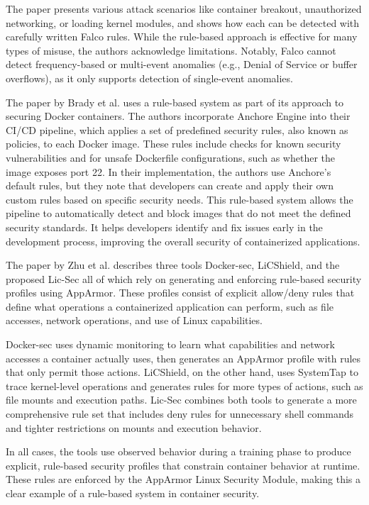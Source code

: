\begin{doublespace}
The paper presents various attack scenarios like container breakout, unauthorized networking, or loading kernel modules, and shows how each can be detected with carefully written Falco rules. While the rule-based approach is effective for many types of misuse, the authors acknowledge limitations. Notably, Falco cannot detect frequency-based or multi-event anomalies (e.g., Denial of Service or buffer overflows), as it only supports detection of single-event anomalies.

The paper by Brady et al. \cite{brady2020docker} uses a rule-based system as part of its approach to securing Docker containers. The authors incorporate Anchore Engine into their CI/CD pipeline, which applies a set of predefined security rules, also known as policies, to each Docker image. These rules include checks for known security vulnerabilities and for unsafe Dockerfile configurations, such as whether the image exposes port 22. In their implementation, the authors use Anchore's default rules, but they note that developers can create and apply their own custom rules based on specific security needs. This rule-based system allows the pipeline to automatically detect and block images that do not meet the defined security standards. It helps developers identify and fix issues early in the development process, improving the overall security of containerized applications.

The paper by Zhu et al. \cite{zhu2021lic} describes three tools Docker-sec, LiCShield, and the proposed Lic-Sec all of which rely on generating and enforcing rule-based security profiles using AppArmor. These profiles consist of explicit allow/deny rules that define what operations a containerized application can perform, such as file accesses, network operations, and use of Linux capabilities.

Docker-sec uses dynamic monitoring to learn what capabilities and network accesses a container actually uses, then generates an AppArmor profile with rules that only permit those actions. LiCShield, on the other hand, uses SystemTap to trace kernel-level operations and generates rules for more types of actions, such as file mounts and execution paths. Lic-Sec combines both tools to generate a more comprehensive rule set that includes deny rules for unnecessary shell commands and tighter restrictions on mounts and execution behavior.

In all cases, the tools use observed behavior during a training phase to produce explicit, rule-based security profiles that constrain container behavior at runtime. These rules are enforced by the AppArmor Linux Security Module, making this a clear example of a rule-based system in container security.


\end{doublespace}
